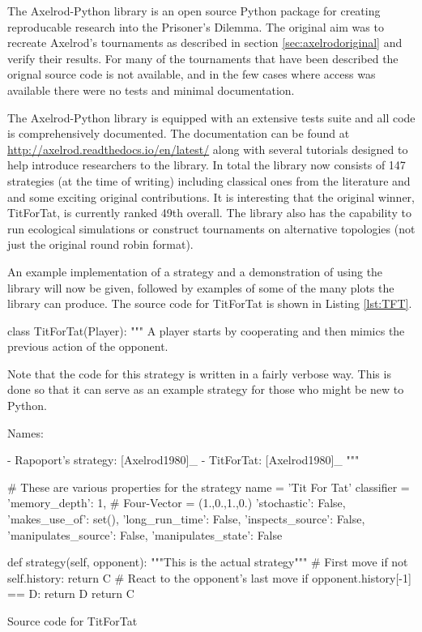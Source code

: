 The Axelrod-Python library \cite{axelrodproject} is an open source Python package for creating reproducable research into the Prisoner's Dilemma.
The original aim was to recreate Axelrod's tournaments as described in section \ref{sec:axelrodoriginal} and verify their results.
For many of the tournaments that have been described the orignal source code is not available, and in the few cases where access was available there were no tests and minimal documentation.

The Axelrod-Python library is equipped with an extensive tests suite and all code is comprehensively documented.
The documentation can be found at \url{http://axelrod.readthedocs.io/en/latest/} along with several tutorials designed to help introduce researchers to the library.
In total the library now consists of 147 strategies (at the time of writing) including classical ones from the literature and and some exciting original contributions.
It is interesting that the original winner, TitForTat, is currently ranked 49th overall.
The library also has the capability to run ecological simulations or construct tournaments on alternative topologies (not just the original round robin format).

An example implementation of a strategy and a demonstration of using the library will now be given, followed by examples of some of the many plots the library can produce.
The source code for TitForTat is shown in Listing \ref{lst:TFT}.

\begin{listing}[htbp!]
\begin{SourceCode}
class TitForTat(Player):
    """
    A player starts by cooperating and then mimics the previous action of the
    opponent.

    Note that the code for this strategy is written in a fairly verbose
    way. This is done so that it can serve as an example strategy for
    those who might be new to Python.

    Names:

    - Rapoport's strategy: [Axelrod1980]_
    - TitForTat: [Axelrod1980]_
    """

    # These are various properties for the strategy
    name = 'Tit For Tat'
    classifier = {
        'memory_depth': 1,  # Four-Vector = (1.,0.,1.,0.)
        'stochastic': False,
        'makes_use_of': set(),
        'long_run_time': False,
        'inspects_source': False,
        'manipulates_source': False,
        'manipulates_state': False
    }

    def strategy(self, opponent):
        """This is the actual strategy"""
        # First move
        if not self.history:
            return C
        # React to the opponent's last move
        if opponent.history[-1] == D:
            return D
        return C
\end{SourceCode}
\caption{Source code for TitForTat}
\label{lst:TFT}
\end{listing}

